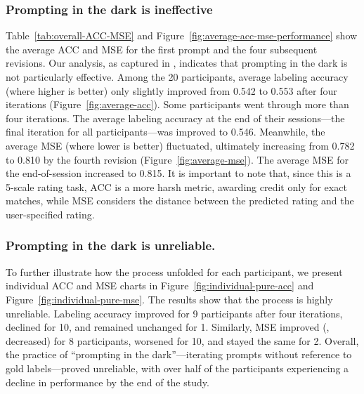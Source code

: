\subsubsection{Prompting in the dark is ineffective}
Table~\ref{tab:overall-ACC-MSE} and Figure~\ref{fig:average-acc-mse-performance} show the average ACC and MSE for the first prompt and the four subsequent revisions.
Our analysis, as captured in \system, indicates that prompting in the dark is not particularly effective. 
Among the 20 participants, average labeling accuracy (where higher is better) only slightly improved from 0.542 to 0.553 after four iterations (Figure~\ref{fig:average-acc}). 
Some participants went through more than four iterations. 
The average labeling accuracy at the end of their sessions---the final iteration for all participants---was improved to 0.546.
Meanwhile, the average MSE (where lower is better) fluctuated, ultimately increasing from 0.782 to 0.810 by the fourth revision (Figure~\ref{fig:average-mse}). 
The average MSE for the end-of-session increased to 0.815.
It is important to note that, since this is a 5-scale rating task, ACC is a more harsh metric, awarding credit only for exact matches, while MSE considers the distance between the predicted rating and the user-specified rating.




\subsubsection{Prompting in the dark is unreliable.}
To further illustrate how the process unfolded for each participant, we present individual ACC and MSE charts in Figure~\ref{fig:individual-pure-acc} and Figure~\ref{fig:individual-pure-mse}. 
The results show that the process is highly unreliable. 
Labeling accuracy improved for 9 participants after four iterations, declined for 10, and remained unchanged for 1. 
Similarly, MSE improved (\ie, decreased) for 8 participants, worsened for 10, and stayed the same for 2. 
Overall, the practice of ``prompting in the dark''---iterating prompts without reference to gold labels---proved unreliable, with over half of the participants experiencing a decline in performance by the end of the study.









